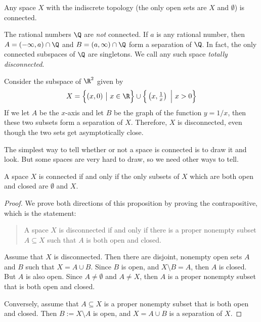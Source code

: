 \documentclass[noname]{notes}
\begin{document}
\begin{example}
	Any space $X$ with the indiscrete topology (the only open sets are $X$ and $\emptyset$) is connected. 
\end{example}

\begin{example}
	The rational numbers $\Q$ are \emph{not} connected. If $a$ is any rational number, then $A = (-\infty, a) \cap \Q$ and $B = (a, \infty) \cap \Q$ form a separation of $\Q$. In fact, the only connected subspaces of $\Q$ are singletons. We call any such space \emph{totally disconnected}. 
\end{example}

\begin{example}
	Consider the subspace of $\R^2$ given by 
	\[
		X = \Big\{ (x,0) \ \big\vert \ x \in \R \Big\} \cup \Big\{ \left(x,\tfrac{1}{x}\right) \ \Big\vert\ x > 0\Big\}
	\]
	If we let $A$ be the $x$-axis and let $B$ be the graph of the function $y = 1/x$, then these two subsets form a separation of $X$. Therefore, $X$ is disconnected, even though the two sets get asymptotically close. 
\end{example}

The simplest way to tell whether or not a space is connected is to draw it and look. But some spaces are very hard to draw, so we need other ways to tell. 

\begin{proposition}
	A space $X$ is connected if and only if the only subsets of $X$ which are both open and closed are $\emptyset$ and $X$. 
\end{proposition}

\begin{proof}
	We prove both directions of this proposition by proving the contrapositive, which is the statement: 
	\begin{quote}
		A space $X$ is disconnected if and only if there is a proper nonempty subset $A \subseteq X$ such that $A$ is both open and closed. 
	\end{quote}
	
	Assume that $X$ is disconnected. Then there are disjoint, nonempty open sets $A$ and $B$ such that $X = A \cup B$. Since $B$ is open, and $X \setminus B = A$, then $A$ is closed. But $A$ is also open. Since $A \neq \emptyset$ and $A \neq X$, then $A$ is a proper nonempty subset that is both open and closed. 
	
	Conversely, assume that $A \subseteq X$ is a proper nonempty subset that is both open and closed. Then $B := X \setminus A$ is open, and $X = A \cup B$ is a separation of $X$. 
\end{proof}
\end{document}
